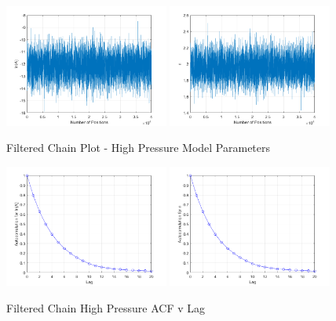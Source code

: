 \documentclass{article}
\begin{document}
\begin{figure}[htb!]
\centering
\includegraphics[width=0.48\textwidth]{FilteredChain_lnA_HP.png}
\includegraphics[width=0.48\textwidth]{FilteredChain_n_HP.png}
\caption{Filtered Chain Plot - High Pressure Model Parameters}
\label{HPChain}
\end{figure}

\begin{figure}[htb!]
\centering
\includegraphics[width=0.48\textwidth]{ACF_lnA_filt_HP.png}
\includegraphics[width=0.48\textwidth]{ACF_n_filt_HP.png}
\caption{Filtered Chain High Pressure ACF v Lag}
\label{autoHP}
\end{figure}
\end{document}
